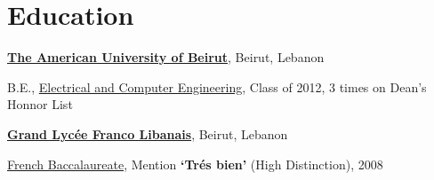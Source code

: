 \section{Education}
\href{http://www.aub.edu.lb/}{\textbf{The American University of Beirut}},
Beirut, Lebanon

\vspace{-0.1cm}

\begin{outerlist}
    \item[] B.E., \href{http://webfea.fea.aub.edu.lb/ece/} {Electrical and Computer Engineering}, Class of 2012, 3 times on Dean's Honnor List
\end{outerlist}

\blankline


\href{http://www.glfl.edu.lb/}{\textbf{Grand Lyc\'ee Franco Libanais}},
Beirut, Lebanon

\vspace{-0.1cm}

\begin{outerlist}
\item[] 
    \href{http://www.education.gouv.fr/cid143/le-baccalaureat.html}{French Baccalaureate}, Mention \textbf{`Tr\'es bien'} (High Distinction), 2008
\end{outerlist}

\vspace{-0.2cm}